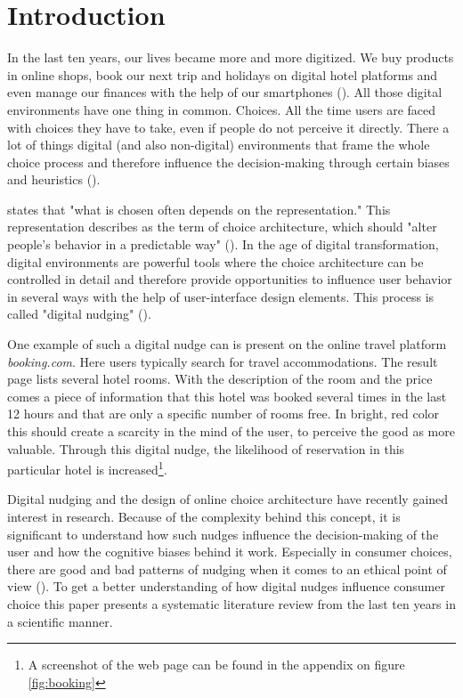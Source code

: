 \section{Introduction}
In the last ten years, our lives became more and more digitized. We buy products in online shops, book our next trip and holidays on digital hotel platforms and even manage our finances with the help of our smartphones (\cite{schneider_digital_2018}). All those digital environments have one thing in common. Choices. All the time users are faced with choices they have to take,  even if people do not perceive it directly. There a lot of things digital (and also non-digital) environments that frame the whole choice process and therefore influence the decision-making through certain biases and heuristics (\cite{tversky_judgment_1974}). 

\cite{johnson_beyond_2012} states that "what is chosen often depends on the representation." This representation describes as the term of choice architecture, which should "alter people's behavior in a predictable way" (\cite{thaler_nudge:_2009}). In the age of digital transformation, digital environments are powerful tools where the choice architecture can be controlled in detail and therefore provide opportunities to influence user behavior in several ways with the help of user-interface design elements. This process is called "digital nudging" (\cite{weinmann_digital_2016}).

One example of such a digital nudge can is present on the online travel platform \textit{booking.com}. Here users typically search for travel accommodations. The result page lists several hotel rooms. With the description of the room and the price comes a piece of information that this hotel was booked several times in the last 12 hours and that are only a specific number of rooms free. In bright, red color this should create a scarcity in the mind of the user, to perceive the good as more valuable. Through this digital nudge, the likelihood of reservation in this particular hotel is increased\footnote{A screenshot of the web page can be found in the appendix on figure \ref{fig:booking}}.

Digital nudging and the design of online choice architecture have recently gained interest in research. Because of the complexity behind this concept, it is significant to understand how such nudges influence the decision-making of the user and how the cognitive biases behind it work. Especially in consumer choices, there are good and bad patterns of nudging when it comes to an ethical point of view (\cite{sunstein_nudging_2015}). To get a better understanding of how digital nudges influence consumer choice this paper presents a systematic literature review from the last ten years in a scientific manner. 

